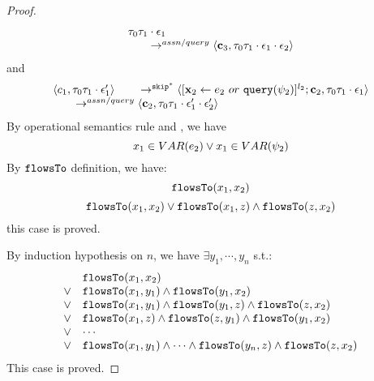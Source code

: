 \begin{proof}
\[\begin{array}{l}
{  \ensuremath{\mathtt{\tau}}_0 \ensuremath{\mathtt{\tau}}_1 \cdot \ensuremath{\mathtt{\epsilon}}_1} 
  \\
  \qquad \rightarrow^{assn/query} 
  \langle {\boldsymbol{\mathbf{c}}}_3,  \mathtt{\tau}_0 \mathtt{\tau}_1 \cdot \mathtt{\epsilon}_1\cdot \mathtt{\epsilon}_2 \rangle 
\end{array}
\]
and
\[
\begin{array}{l}
\langle c_1, \mathtt{\tau}_0 \mathtt{\tau}_1 \cdot \mathtt{\epsilon}_1' \rangle 
  \qquad \rightarrow^{\mathtt{skip}^*} 
  \langle [\mathrel{ {\boldsymbol{\mathbf{x}}}_2 \leftarrow e_2 ~ or ~ {\tt query}(\psi_2) }]^{l_2} ; {\boldsymbol{\mathbf{c}}}_2, \mathtt{\tau}_0 \mathtt{\tau}_1 \cdot \mathtt{\epsilon}_1 \rangle 
  \\
  \qquad \rightarrow^{assn/query} 
  \langle {\boldsymbol{\mathbf{c}}}_2,  \mathtt{\tau}_0 \mathtt{\tau}_1 \cdot \mathtt{\epsilon}_1' \cdot \mathtt{\epsilon}_2' \rangle
\end{array} 
\]
By operational semantics rule  and , we have 
\[
  x_1 \in VAR(e_2) \lor x_1 \in VAR(\psi_2)
\]
By $\mathtt{flowsTo}$ definition, we have:
\[
\mathtt{flowsTo}(x_1, x_2)
\]
\[
  \mathtt{flowsTo}(x_1, x_2) \lor \mathtt{flowsTo}(x_1, z) \land \mathtt{flowsTo}(z, x_2)
\]
this case is proved.

By induction hypothesis on $n$, we have $\exists y_1, \cdots, y_n$ s.t.:
\[
\begin{array}{ll}
      & \mathtt{flowsTo}(x_1, x_2) \\
  \lor  & \mathtt{flowsTo}(x_1, y_1) \land \mathtt{flowsTo}(y_1, x_2)\\
  \lor  & \mathtt{flowsTo}(x_1, y_1) \land \mathtt{flowsTo}(y_1, z) \land \mathtt{flowsTo}(z, x_2) \\
  \lor  & \mathtt{flowsTo}(x_1, z) \land \mathtt{flowsTo}(z, y_1) \land \mathtt{flowsTo}(y_1, x_2) \\
  \lor  & \cdots \\
  \lor  & \mathtt{flowsTo}(x_1, y_1) \land \cdots \land \mathtt{flowsTo}(y_n, z) \land \mathtt{flowsTo}(z, x_2) \\
\end{array}
\]
This case is proved.


\end{proof}
